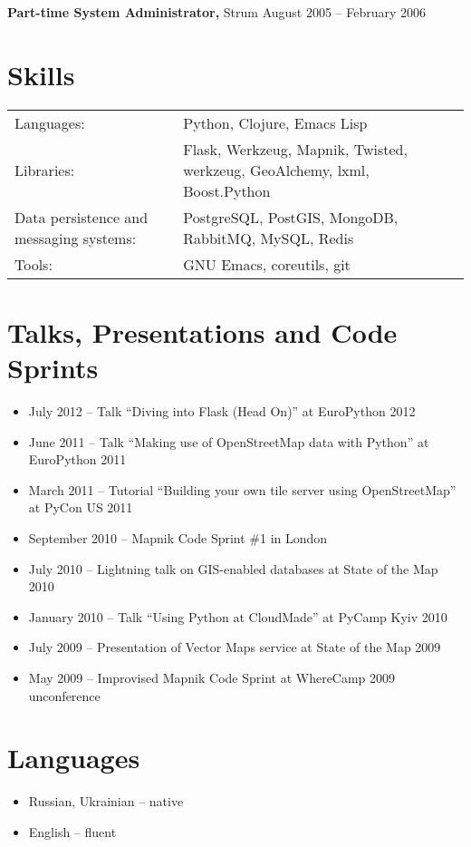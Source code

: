 \documentclass[margin]{res}
\begin{document}
\begin{resume}
{\bf Part-time System Administrator,} Strum \hfill August 2005 -- February 2006



\section{Skills}
\begin{tabular}{l p{3in}}
  Languages: & Python, Clojure, Emacs Lisp \\
  Libraries: & Flask, Werkzeug, Mapnik, Twisted, werkzeug, GeoAlchemy, lxml, Boost.Python \\
  Data persistence and messaging systems: & PostgreSQL, PostGIS, MongoDB, RabbitMQ, MySQL, Redis \\
  Tools: & GNU Emacs, coreutils, git
\end{tabular}

\section{Talks, Presentations and Code Sprints}

\begin{itemize}
\item July 2012 -- Talk ``Diving into Flask (Head On)'' at EuroPython 2012
\item June 2011 -- Talk ``Making use of OpenStreetMap data with Python'' at EuroPython 2011
\item March 2011 -- Tutorial ``Building your own tile server using OpenStreetMap'' at PyCon US 2011
\item September 2010 -- Mapnik Code Sprint \#1 in London
\item July 2010 -- Lightning talk on GIS-enabled databases at State of the Map 2010
\item January 2010 -- Talk ``Using Python at CloudMade'' at PyCamp Kyiv 2010
\item July 2009 -- Presentation of Vector Maps service at State of the Map 2009
\item May 2009 -- Improvised Mapnik Code Sprint at WhereCamp 2009 unconference
\end{itemize}

\section{Languages}
\begin{itemize} \itemsep -1pt
\item Russian, Ukrainian -- native
\item English -- fluent
\end{itemize}

\end{resume}
\end{document}
